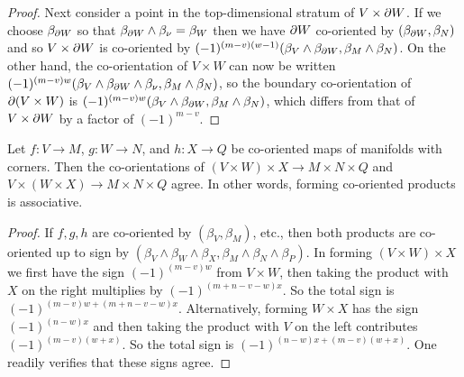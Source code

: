 \begin{proof}
	Next consider a point in the top-dimensional stratum of $V \times \partial W$.
	If we choose $\beta_{\partial W}$ so that $\beta_{\partial W} \wedge \beta_\nu = \beta_W$ then we have $\partial W$ co-oriented by $(\beta_{\partial W},\beta_N)$ and so $V \times \partial W$ is co-oriented by $(-1)^{(m-v)(w-1)}(\beta_{V} \wedge \beta_{\partial W},\beta_M \wedge \beta_N)$.
	On the other hand, the co-orientation of $V \times W$ can now be written $(-1)^{(m-v)w}(\beta_{V} \wedge \beta_{\partial W} \wedge \beta_\nu,\beta_M \wedge \beta_N)$, so the boundary co-orientation of $\partial(V \times W)$ is $(-1)^{(m-v)w}(\beta_{V} \wedge \beta_{\partial W},\beta_{M} \wedge \beta_N)$, which differs from that of $V \times \partial W$ by a factor of $(-1)^{m-v}$.
\end{proof}

\begin{proposition}\label{P: exterior associativity}
	Let $f \colon V \to M$, $g \colon W \to N$, and $h \colon X \to Q$ be co-oriented maps of manifolds with corners.
	Then the co-orientations of $(V \times W) \times X \to M \times N \times Q$ and $V \times (W \times X) \to M \times N \times Q$ agree.
	In other words, forming co-oriented products is associative.
\end{proposition}

\begin{proof}
	If $f,g,h$ are co-oriented by $(\beta_V,\beta_M)$, etc., then both products are co-oriented up to sign by $(\beta_V \wedge \beta_W \wedge \beta_X,\beta_M \wedge \beta_N \wedge \beta_P)$.
	In forming $(V \times W) \times X$ we first have the sign $(-1)^{(m-v)w}$ from $V \times W$, then taking the product with $X$ on the right multiplies by $(-1)^{(m+n-v-w)x}$.
	So the total sign is $(-1)^{(m-v)w+(m+n-v-w)x}$.
	Alternatively, forming $W \times X$ has the sign $(-1)^{(n-w)x}$ and then taking the product with $V$ on the left contributes $(-1)^{(m-v)(w+x)}$.
	So the total sign is $(-1)^{(n-w)x+(m-v)(w+x)}$.
	One readily verifies that these signs agree.
\end{proof}

